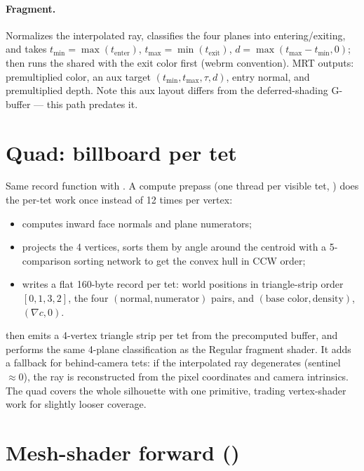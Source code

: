 \paragraph{Fragment.} Normalizes the interpolated ray, classifies the four
planes into entering/exiting, and takes
$t_{\min} = \max(t_{\text{enter}})$, $t_{\max} = \min(t_{\text{exit}})$,
$d = \max(t_{\max} - t_{\min}, 0)$; then runs the shared
 with the exit color first (webrm convention). MRT
outputs: premultiplied color, an aux target
$(t_{\min}, t_{\max}, \tau, d)$, entry normal, and premultiplied depth. Note
this aux layout differs from the deferred-shading G-buffer --- this path
predates it.

\section{Quad: billboard per tet}

Same record function with . A compute prepass
(one thread per visible tet, ) does the
per-tet work once instead of 12 times per vertex:

\begin{itemize}
\item computes inward face normals and plane numerators;
\item projects the 4 vertices, sorts them by angle around the centroid with a
  5-comparison sorting network to get the convex hull in CCW order;
\item writes a flat 160-byte record per tet: world positions in triangle-strip
  order $[0,1,3,2]$, the four $(\text{normal}, \text{numerator})$ pairs, and
  $(\text{base color}, \text{density})$, $(\nabla c, 0)$.
\end{itemize}

 then emits a 4-vertex triangle strip per tet
from the precomputed buffer, and  performs
the same 4-plane classification as the Regular fragment shader. It adds a
fallback for behind-camera tets: if the interpolated ray degenerates
(sentinel $\approx 0$), the ray is reconstructed from the pixel coordinates
and camera intrinsics. The quad covers the whole silhouette with one
primitive, trading vertex-shader work for slightly looser coverage.

\section{Mesh-shader forward ()}

